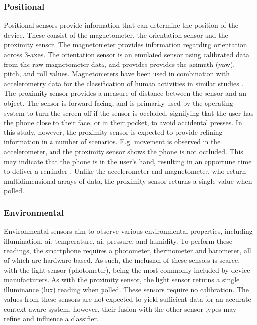 \subsubsection{Positional}
Positional sensors provide information that can determine the position of the device. These consist of the magnetometer, the orientation sensor and the proximity sensor.
The magnetometer provides information regarding orientation across 3-axes. The orientation sensor is an emulated sensor using calibrated data from the raw magnetometer data, and provides provides the azimuth (yaw), pitch, and roll values.
Magnetometers have been used in combination with accelerometry data for the classification of human activities in similar studies \cite{Zhang2015,Catal2015}.
The proximity sensor provides a measure of distance between the sensor and an object. The sensor is forward facing, and is primarily used by the operating system to turn the screen off if the sensor is occluded, signifying that the user has the phone close to their face, or in their pocket, to avoid accidental presses. In this study, however, the proximity sensor is expected to provide refining information in a number of scenarios. E.g. movement is observed in the accelerometer, and the proximity sensor shows the phone is not occluded. This may indicate that the phone is in the user's hand, resulting in an opportune time to deliver a reminder \cite{Hoseini-Tabatabaei2013}. Unlike the accelerometer and magnetometer, who return multidimensional arrays of data, the proximity sensor returns a single value when polled.

\subsubsection{Environmental}
Environmental sensors aim to observe various environmental properties, including illumination, air temperature, air pressure, and humidity. To perform these readings, the smartphone requires a photometer, thermometer and barometer, all of which are hardware based. As such, the inclusion of these sensors is scarce, with the light sensor (photometer), being the most commonly included by device manufacturers. As with the proximity sensor, the light sensor returns a single illuminance (lux) reading when polled. These sensors require no calibration. The values from these sensors are not expected to yield sufficient data for an accurate context aware system, however, their fusion with the other sensor types may refine and influence a classifier.


